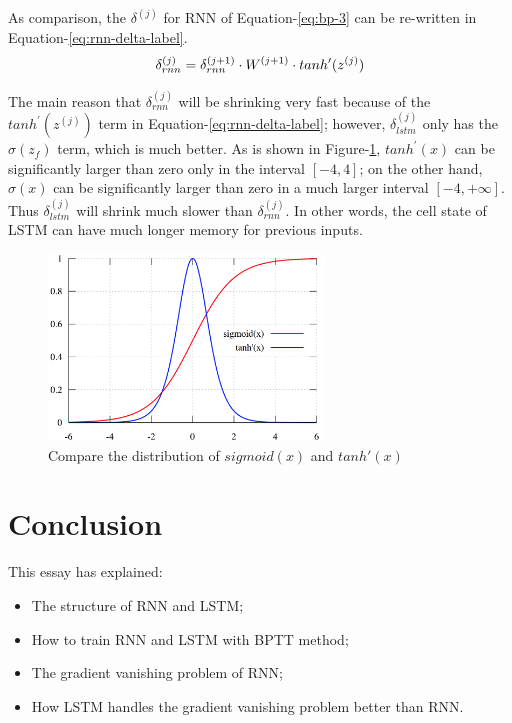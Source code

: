 \documentclass{article}
\begin{document}
As comparison, the $\delta^{(j)}$ for RNN of Equation-\ref{eq:bp-3} can be re-written in Equation-\ref{eq:rnn-delta-label}.
\begin{equation}\label{eq:rnn-delta-label}
 \delta^{(j)}_{rnn} = \delta^{(j+1)}_{rnn} \cdot W^{(j+1)} \cdot tanh^{\prime}(z^{(j)})\\
\end{equation}

The main reason that $\delta^{(j)}_{rnn}$ will be shrinking very fast because of the $tanh^{\prime}(z^{(j)})$ term in Equation-\ref{eq:rnn-delta-label};
however, $\delta^{(j)}_{lstm}$ only has the $\sigma(z_f)$ term, which is much better. As is shown in Figure-\ref{fig:compare}, $tanh^{\prime}(x)$ 
can be significantly larger than zero only in the interval $[-4, 4]$; on the other hand, $\sigma(x)$  can be significantly larger than zero in a much larger
interval $[-4, +\infty]$. Thus $\delta^{(j)}_{lstm}$ will shrink much slower than $\delta^{(j)}_{rnn}$. In other words, the cell state of LSTM can have much
longer memory for previous inputs.

\begin{figure}[htbp]
	\centering
	\includegraphics[width=0.65\textwidth, keepaspectratio]{compare}
	\caption{Compare the distribution of $sigmoid(x)$ and $tanh'(x)$}
	\label{fig:compare}
\end{figure}


\section{Conclusion}
This essay has explained:
 \begin{itemize}
  \item The structure of RNN and LSTM;
  \item How to train RNN and LSTM with BPTT method;
  \item The gradient vanishing problem of RNN;
  \item How LSTM handles the gradient vanishing problem better than RNN.
 \end{itemize}
\end{document}
